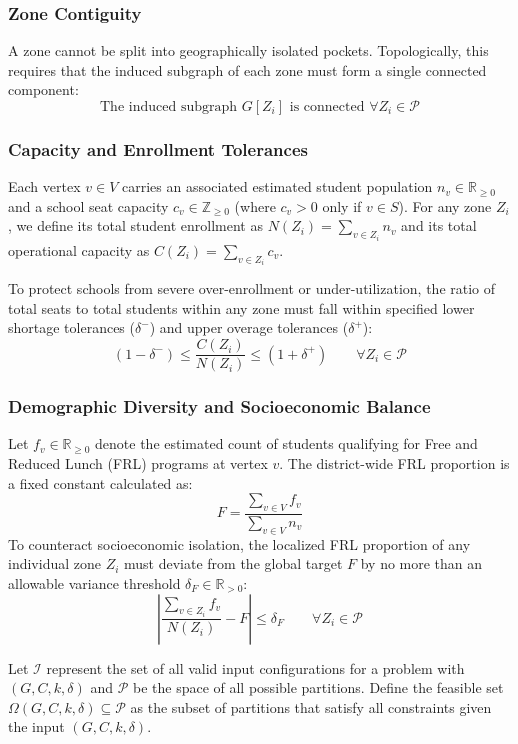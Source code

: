 \documentclass{article}
\begin{document}
\subsubsection{Zone Contiguity}
A zone cannot be split into geographically isolated pockets. Topologically, this requires that the induced subgraph of each zone must form a single connected component:
$$\text{The induced subgraph } G[Z_i] \text{ is connected } \forall Z_i \in \mathcal{P}$$

\subsubsection{Capacity and Enrollment Tolerances}
Each vertex $v \in V$ carries an associated estimated student population $n_v \in \mathbb{R}_{\geq 0}$ and a school seat capacity $c_v \in \mathbb{Z}_{\geq 0}$ (where $c_v > 0$ only if $v \in S$). For any zone $Z_i$, we define its total student enrollment as $N(Z_i) = \sum_{v \in Z_i} n_v$ and its total operational capacity as $C(Z_i) = \sum_{v \in Z_i} c_v$.

To protect schools from severe over-enrollment or under-utilization, the ratio of total seats to total students within any zone must fall within specified lower shortage tolerances ($\delta^{-}$) and upper overage tolerances ($\delta^{+}$):
$$(1-\delta^{-}) \leq \frac{C(Z_i)}{N(Z_i)} \leq (1+\delta^{+}) \qquad \forall Z_i \in \mathcal{P}$$

\subsubsection{Demographic Diversity and Socioeconomic Balance}
Let $f_v \in \mathbb{R}_{\geq 0}$ denote the estimated count of students qualifying for Free and Reduced Lunch (FRL) programs at vertex $v$. The district-wide FRL proportion is a fixed constant calculated as:
$$F = \frac{\sum_{v \in V} f_v}{\sum_{v \in V} n_v}$$
To counteract socioeconomic isolation, the localized FRL proportion of any individual zone $Z_i$ must deviate from the global target $F$ by no more than an allowable variance threshold $\delta_F \in \mathbb{R}_{>0}$:
$$\left| \frac{\sum_{v \in Z_i} f_v}{N(Z_i)} - F \right| \leq \delta_F \qquad \forall Z_i \in \mathcal{P}$$

Let $\mathcal{I}$ represent the set of all valid input configurations for a problem with $(G, C, k, \delta)$ and $\mathcal{P}$ be the space of all possible partitions. Define the feasible set $\Omega(G, C, k, \delta) \subseteq \mathcal{P}$ as the subset of partitions that satisfy all constraints given the input $(G, C, k, \delta)$.
\end{document}
